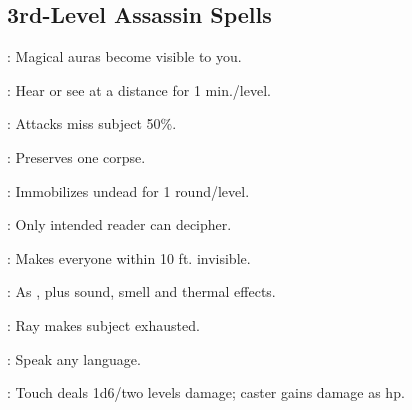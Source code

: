 \begin{multicols}{2}
\subsection{3rd-Level Assassin Spells}
\begin{description*}
\item[\linkspell{Arcane Sight}:] Magical auras become visible to you.
\item[\linkspell{Clairaudience/Clairvoyance}:] Hear or see at a distance for 1 min./level.
\item[\linkspell{Displacement}:] Attacks miss subject 50\%.
\item[\linkspell{Gentle Repose}:] Preserves one corpse.
\item[\linkspell{Halt Undead}:] Immobilizes undead for 1 round/level.
\item[\linkspell{Illusory Script}:] Only intended reader can decipher.
\item[\linkspell{Invisibility Sphere}:] Makes everyone within 10 ft. invisible.
\item[\linkspell{Major Image}:] As , plus sound, smell and thermal effects.
\item[\linkspell{Ray of Exhaustion}:] Ray makes subject exhausted.
\item[\linkspell{Tongues}:] Speak any language.
\item[\linkspell{Vampiric Touch}:] Touch deals 1d6/two levels damage; caster gains damage as hp.
\end{description*}


\end{multicols}
